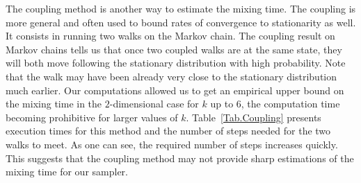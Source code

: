 \documentclass[a4paper]{article}
\begin{document}

The coupling method is another way to estimate the mixing time. The coupling is more general and often used to bound rates of convergence to stationarity as well. It consists in running two walks on the Markov chain.
The coupling result on Markov chains tells us that once two coupled walks are at the same state, they will both move following the stationary distribution with high probability. Note that the walk may have been already very close to the stationary distribution much earlier.
Our computations allowed us to get an empirical upper bound on the  mixing time in the $2$-dimensional case for $k$ up to $6$, the computation time becoming prohibitive for larger values of $k$.
Table~\ref{Tab.Coupling} presents execution times for this method and the number of steps needed for the two walks to meet.
As one can see, the required number of steps increases quickly. This suggests that the coupling method may not provide sharp estimations of the mixing time for our sampler.
\end{document}
